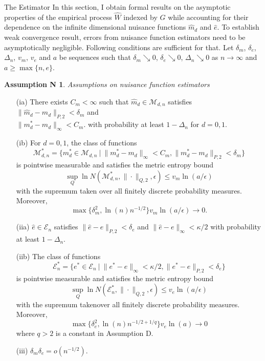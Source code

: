 \documentclass[12pt,oneside,reqno,english]{amsart}
\makeatletter
\renewcommand\subsection{\@startsection{subsection}{2}%
  \z@{-.5\linespacing\@plus-.7\linespacing}{.5\linespacing}%
  {\normalfont\scshape}}
\theoremstyle{definition}
\newtheorem*{asmN}{Assumption N}
\makeatother
\begin{document}
\subsection{The Estimator}\label{est}
In this section, I obtain formal results on the asymptotic properties of the empirical process $\hat{W}$ indexed by $G$ while accounting for their dependence on the 
infinite dimensional nuisance functions $\hat{m}_{d}$ and $\hat{e}$. 
To establish weak convergence result, errors from nuisance function estimators need to be asymptotically negligible. 
Following conditions are sufficient for that. 
Let $\delta_{m}$, $\delta_{e}$, $\Delta_{n}$, $v_{m}$, $v_{e}$ and $a$ be sequences such that 
$\delta_{m}\searrow 0$, $\delta_{e}\searrow 0$, $\Delta_{n}\searrow 0$ as $n\rightarrow \infty$ and $a\geq \max\{n,e\}$. 
\begin{asmN} \textit{Assumptions on nuisance function estimators}
\begin{itemize}
\item[{(ia)}] There exists $C_{m}<\infty$ such that $\hat{m}_{d}\in \mathcal{M}_{d,n}$ satisfies 
$\|\hat{m}_{d}-m_{d}\|_{P,2}<\delta_{m}$ and\\ $\|m^{*}_{d}-m_{d}\|_{\infty}<C_{m}$.
 with probability at least $1-\Delta_{n}$ for $d=0,1$. 
\item[{(ib)}] For $d=0,1$, the class of functions
\[\mathcal{M}^{*}_{d,n}=\{m^{*}_{d}\in \mathcal{M}_{d,n}\ | \ \|m^{*}_{d}-m_{d}\|_{\infty}<C_{m}, \|m^{*}_{d}-m_{d}\|_{P,2}<\delta_{m}\}\] 
is pointwise measurable and satisfies the metric entropy bound
\[\sup_{Q}\ln N(\mathcal{M}^{*}_{d,n},\|\cdot\|_{Q,2},\epsilon)\leq v_{m}\ln(a/\epsilon)\]
with the supremum taken over all finitely discrete probability measures.
 Moreover, 
\[\max\{\delta_{m}^{2},\ln(n)n^{-1/2}\}v_{m}\ln(a/\epsilon)\rightarrow 0.\]
\item[{(iia)}] $\hat{e}\in \mathcal{E}_{n}$ satisfies 
$\|\hat{e}-e\|_{P,2}<\delta_{e}$ 
and
$\|\hat{e}-e\|_{\infty}<\kappa/2$ 
 with probability at least $1-\Delta_{n}$. 
\item[{(iib)}] The class of functions 
\[\mathcal{E}^{*}_{n}=\{e^{*}\in \mathcal{E}_{n}\ | \ \|e^{*}-e\|_{\infty}<\kappa/2, \|e^{*}-e\|_{P,2}<\delta_{e}\}\] 
is pointwise measurable and satisfies the metric entropy bound
\[\sup_{Q}\ln N(\mathcal{E}^{*}_{n},\|\cdot\|_{Q,2},\epsilon)\leq v_{e}\ln(a/\epsilon)\]
with the supremum takenover all finitely discrete probability measures. 
Moreover, 
\[\max\{\delta_{e}^{2},\ln(n)n^{-1/2+1/q}\}v_{e}\ln(a)\rightarrow 0\]
where $q>2$ is a constant in Assumption D. 
\item[(iii)] $\delta_{m}\delta_{e}=o(n^{-1/2})$.
\end{itemize}
\end{asmN}
\end{document}
